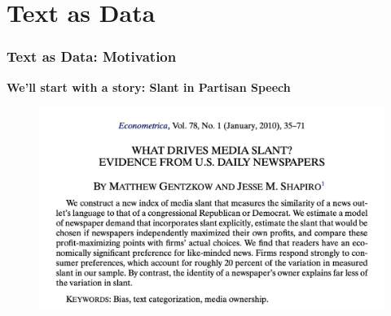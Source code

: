 \documentclass[
  shownotes,
  xcolor={svgnames},
  hyperref={colorlinks,citecolor=DarkBlue,linkcolor=DarkRed,urlcolor=DarkBlue}
  , aspectratio=169]{beamer}
\newcommand{\theme}{\color{andesred}}
\begin{document}
\section{Text as Data}
\begin{frame}[fragile]
\frametitle{Text as Data: Motivation}

{\bf We'll start with a story: \theme Slant in Partisan Speech}

  \begin{figure}[H] \centering
            \captionsetup{justification=centering}
              \includegraphics[scale=0.6]{figures/gentzgow_shapiro}
              
 \end{figure}

\end{frame}
\end{document}
